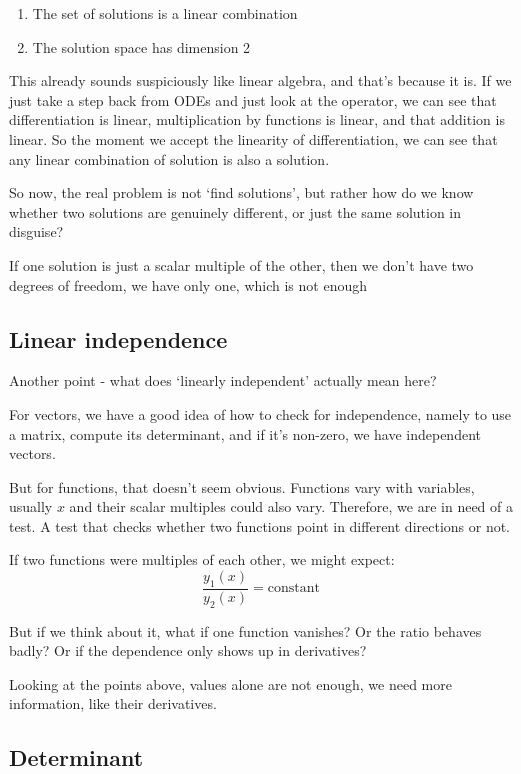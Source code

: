 \begin{enumerate}
    \item The set of solutions is a linear combination 
    \item The solution space has dimension 2 
\end{enumerate}

This already sounds suspiciously like linear algebra, and that’s because it is. If we just take a step back from ODEs and just look at the operator, we can see that differentiation is linear, multiplication by functions is linear, and that addition is linear. So the moment we accept the linearity of differentiation, we can see that any linear combination of solution is also a solution. 

So now, the real problem is not `find solutions', but rather how do we know whether two solutions are genuinely different, or just the same solution in disguise?

If one solution is just a scalar multiple of the other, then we don’t have two degrees of freedom, we have only one, which is not enough 

\subsection{Linear independence}

Another point - what does `linearly independent' actually mean here?

For vectors, we have a good idea of how to check for independence, namely to use a matrix, compute its determinant, and if it's non-zero, we have independent vectors. 

But for functions, that doesn't seem obvious. Functions vary with variables, usually $x$ and their scalar multiples could also vary. Therefore, we are in need of a test. A test that checks whether two functions point in different directions or not. 


If two functions were multiples of each other, we might expect:
$$\frac{y_1(x)}{y_2(x)} = \text{constant}$$

But if we think about it, what if one function vanishes? Or the ratio behaves badly? Or if the dependence only shows up in derivatives? 

Looking at the points above, values alone are not enough, we need more information, like their derivatives.

\subsection{Determinant}

